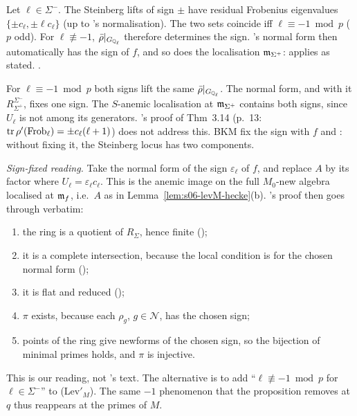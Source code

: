\begin{remark}\label{rem:s06-levM-sign}
Let $\ell\in\Sigma^-$. The Steinberg lifts of sign $\pm$ have residual Frobenius eigenvalues $\{\pm c_\ell,\pm\ell c_\ell\}$ (up to \cite{KO}'s
normalisation). The two sets coincide iff $\ell\equiv-1\bmod p$ ($p$ odd). For $\ell\not\equiv-1$, $\bar\rho|_{G_{\mathbb{Q}_\ell}}$ therefore
determines the sign. \cite{KO}'s normal form \cite[\S3.2.5, p.~11: ``we may assume'' by a twist, citing Maz89 Prop.~1]{KO} then automatically
has the sign of $f$, and so does the localisation $\mathfrak{m}_{\Sigma^+}$: \cite[Thm~3.14]{KO} applies as stated. \stcited.

For $\ell\equiv-1\bmod p$ both signs lift the same $\bar\rho|_{G_{\mathbb{Q}_\ell}}$. The normal form, and with it $R^{\Sigma^-}_{\Sigma^+}$, fixes
one sign. The $S$-anemic localisation at $\mathfrak{m}_{\Sigma^+}$ contains both signs, since $U_\ell$ is not among its generators. \cite{KO}'s proof of
Thm~3.14 (p.~13: $\operatorname{tr}\rho'(\mathrm{Frob}_\ell)=\pm c_\ell(\ell+1)$) does not address this. BKM fix the sign with $f$
\cite[\S4.2, p.~11; \S5, p.~14]{BKM}
 and \cite[\S4, p.~24]{BKMlg}
: without fixing
it, the Steinberg locus has two components.

\emph{Sign-fixed reading.} Take the normal form of the sign $\varepsilon_\ell$ of $f$, and replace $A$ by its factor where $U_\ell=\varepsilon_\ell c_\ell$.
This is the anemic image on the full $M_0$-new algebra localised at $\mathfrak{m}_f$, i.e.\ $A$ as in Lemma~\ref{lem:s06-levM-hecke}(b). \cite{KO}'s
proof then goes through verbatim:
\begin{enumerate}[label=(\roman*)]
\item the ring is a quotient of $R_\Sigma$, hence finite (\cite[Thm~2.9]{KO});
\item it is a complete intersection, because the local condition is \cite[Def.~3.7(1)]{KO} for the chosen normal form (\cite[Lemma~3.8,
  Cor.~3.13]{KO});
\item it is flat and reduced (\cite[Lemmas~3.15, 3.16]{KO});
\item $\pi$ exists, because each $\rho_g$, $g\in\mathcal N$, has the chosen sign;
\item points of the ring give newforms of the chosen sign, so the bijection of minimal primes holds, and $\pi$ is injective.
\end{enumerate}
\stpmc{} This is our reading, not \cite{KO}'s text. The alternative is to add ``$\ell\not\equiv-1\bmod p$ for $\ell\in\Sigma^-$'' to (Lev$'_M$). The
same $-1$ phenomenon that the proposition removes at $q$ thus reappears at the primes of $M$.

\end{remark}

